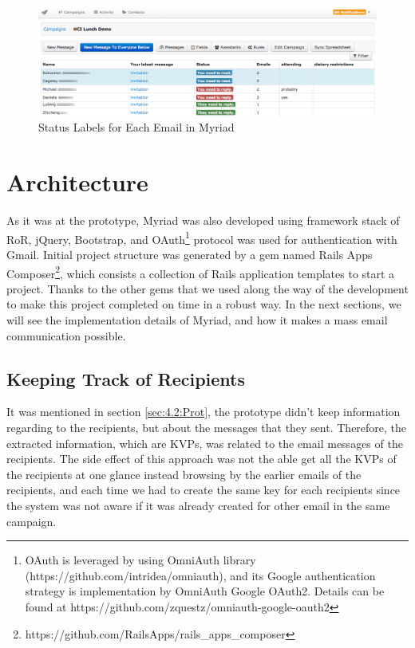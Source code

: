 \clearpage

\begin{figure}[htbp]
	\centering
	\includegraphics[width=1.00\textwidth]{imgs/EmailStatuses.png}
	\caption[Status Labels for Each Email in Myriad]{Status Labels for Each Email in Myriad}
	\label{fig:EmailStatuses}
\end{figure}

\section{Architecture}
\label{sec:5.3:FinaArch}

As it was at the prototype, Myriad was also developed using framework stack of \ac{RoR}, jQuery, Bootstrap, and OAuth\footnote{OAuth is leveraged by using OmniAuth library (https://github.com/intridea/omniauth), and its Google authentication strategy is implementation by OmniAuth Google OAuth2. Details can be found at https://github.com/zquestz/omniauth-google-oauth2} protocol was used for authentication with Gmail. Initial project structure was generated by a gem named Rails Apps Composer\footnote{https://github.com/RailsApps/rails\_apps\_composer}, which consists a collection of Rails application templates to start a project. Thanks to the other gems that we used along the way of the development to make this project completed on time in a robust way. In the next sections, we will see the implementation details of Myriad, and how it makes a mass email communication possible.

\subsection{Keeping Track of Recipients}
\label{subsec:5.3.1:ReciCont}

It was mentioned in section \ref{sec:4.2:Prot}, the prototype didn't keep information regarding to the recipients, but about the messages that they sent. Therefore, the extracted information, which are \ac{KVP}s, was related to the email messages of the recipients. The side effect of this approach was not the able get all the \ac{KVP}s of the recipients at one glance instead browsing by the earlier emails of the recipients, and each time we had to create the same key for each recipients since the system was not aware if it was already created for other email in the same campaign.
\vspace{1cm}

